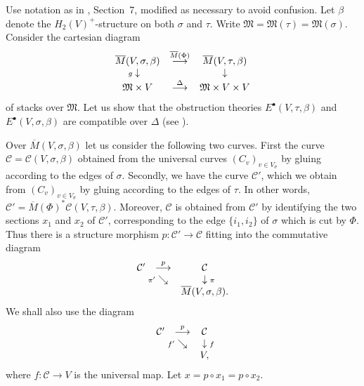 \documentclass[11pt]{article}
\newcommand{\MM}{\mathfrak{M}}
\newcommand{\cC}{\mathcal{C}}
\newcommand{\com}{^{\scriptscriptstyle\bullet}}
\newcommand{\comdia}[9]{
\begin{array}{ccc}
#1 & \stackrel{#2}{\longrightarrow} & #3 \\
\ldiag{#4} & #5 & \rdiag{#6} \\
#7 & \stackrel{#8}{\longrightarrow} & #9
\end{array}}
\newcommand{\comp}{\mathbin{{\scriptstyle\circ}}}
\newcommand{\comtri}[6]{
\begin{array}{ccc}
#1 & \stackrel{#2}{\longrightarrow} & #3         \\
   & \sediag{#4}                    & \rdiag{#5} \\
   &                                & #6
\end{array}}
\newcommand{\ldiag}[1]{\makebox[0cm]{\({\scriptstyle#1}\downarrow\phantom{\scriptstyle#1}\)}}
\newcommand{\ol}{\overline}
\newcommand{\rdiag}[1]{\makebox[0cm]{\(\phantom{\scriptstyle#1}\downarrow{\scriptstyle#1}\)}}
\newcommand{\sediag}[1]{\makebox[0cm]{\({\scriptstyle#1}\searrow\phantom{\scriptstyle#1}\)}}
\newcommand{\upst}{^{\ast}}
\theoremstyle{plain}
\theoremstyle{remark}
\theoremstyle{plain}
\theoremstyle{definition}
\theoremstyle{remark}
\begin{document}
Use notation as in \cite{BM}, Section~7, modified as necessary to
avoid confusion. Let \(\beta\) denote the \(H_2(V)^+\)-structure on both
\(\sigma\) and \(\tau\). Write \(\MM=\MM(\tau)=\MM(\sigma)\). Consider the
cartesian diagram
\[
\comdia{\ol{M}(V,\sigma,\beta)}{\ol{M}(
\Phi)}{\ol{M}(V,\tau,\beta)}{ g}{}{ }{\MM\times V}{ \Delta}{ \MM\times
V\times V}
\]
of stacks over \(\MM\). Let us show that the obstruction theories
\(E\com(V,\tau,\beta)\) and \(E\com(V,\sigma,\beta)\) are compatible over
\(\Delta\) (see \cite{BF}).

Over \(\ol{M}(V,\sigma,\beta)\) let us consider the following two
curves. First the curve \(\cC=\cC(V,\sigma,\beta)\) obtained from the
universal curves \((C_v)_{v\in V_{\sigma}}\) by gluing according to the
edges of \(\sigma\). Secondly, we have the curve \(\cC'\), which we obtain
from \((C_v)_{v\in V_{\sigma}}\) by gluing according to the
edges of \(\tau\). In other words,
\(\cC'=\ol{M}(\Phi)\upst\cC(V,\tau,\beta)\). Moreover, \(\cC\) is obtained
from \(\cC'\) by identifying the two sections \(x_1\) and \(x_2\) of \(\cC'\),
corresponding to the edge \(\{i_1,i_2\}\) of \(\sigma\) which is cut by
\(\Phi\). Thus there is a structure morphism \(p:\cC'\to\cC\) fitting into
the commutative diagram
\[
\comtri{\cC'}{p}{\cC}{\pi'}{\pi}{\ol{M}(V,\sigma,\beta).}
\]
We shall also use the diagram
\[
\comtri{\cC'}{p}{\cC}{f'}{f}{V,}
\]
where \(f:\cC\to V\) is the universal map. Let \(x=p\comp x_1=p\comp
x_2\).
\end{document}
